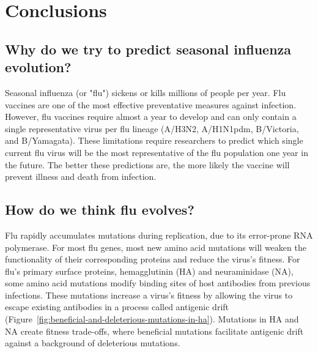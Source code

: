 \chapter{Conclusions}

\section{Why do we try to predict seasonal influenza evolution?}

Seasonal influenza (or "flu") sickens or kills millions of people per year.
Flu vaccines are one of the most effective preventative measures against infection.
However, flu vaccines require almost a year to develop and can only contain a single representative virus per flu lineage (A/H3N2, A/H1N1pdm, B/Victoria, and B/Yamagata).
These limitations require researchers to predict which single current flu virus will be the most representative of the flu population one year in the future.
The better these predictions are, the more likely the vaccine will prevent illness and death from infection.

\section{How do we think flu evolves?}

Flu rapidly accumulates mutations during replication, due to its error-prone RNA polymerase.
For most flu genes, most new amino acid mutations will weaken the functionality of their corresponding proteins and reduce the virus's fitness.
For flu's primary surface proteins, hemagglutinin (HA) and neuraminidase (NA), some amino acid mutations modify binding sites of host antibodies from previous infections.
These mutations increase a virus's fitness by allowing the virus to escape existing antibodies in a process called antigenic drift (Figure~\ref{fig:beneficial-and-deleterious-mutations-in-ha}).
Mutations in HA and NA create fitness trade-offs, where beneficial mutations facilitate antigenic drift against a background of deleterious mutations.

